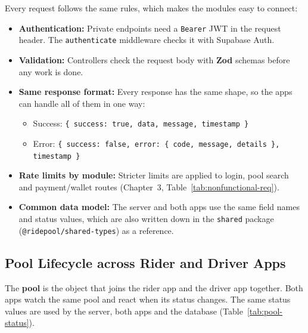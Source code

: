 Every request follows the same rules, which makes the modules easy to connect:

\begin{itemize}
  \item \textbf{Authentication:} Private endpoints need a \texttt{Bearer} JWT
        in the request header. The \texttt{authenticate} middleware checks it
        with Supabase Auth.
  \item \textbf{Validation:} Controllers check the request body with
        \textbf{Zod} schemas before any work is done.
  \item \textbf{Same response format:} Every response has the same shape, so
        the apps can handle all of them in one way:
        \begin{itemize}
          \item Success: \texttt{\{ success: true, data, message, timestamp \}}
          \item Error: \texttt{\{ success: false, error: \{ code, message,
                details \}, timestamp \}}
        \end{itemize}
  \item \textbf{Rate limits by module:} Stricter limits are applied to login,
        pool search and payment/wallet routes (Chapter~3,
        Table~\ref{tab:nonfunctional-req}).
  \item \textbf{Common data model:} The server and both apps use the same
        field names and status values, which are also written down in the
        \texttt{shared} package (\texttt{@ridepool/shared-types}) as a
        reference.
\end{itemize}

\subsection{Pool Lifecycle across Rider and Driver Apps}
\label{subsec:pool-lifecycle}

The \textbf{pool} is the object that joins the rider app and the driver app
together. Both apps watch the same pool and react when its status changes. The
same status values are used by the server, both apps and the database
(Table~\ref{tab:pool-status}).

